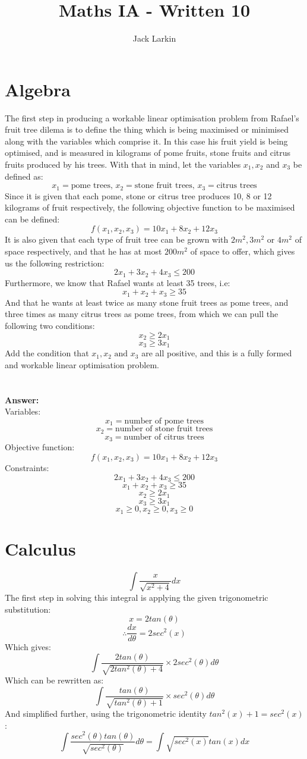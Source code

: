 \documentclass[11pt]{article}
\title{\textbf{Maths IA - Written 10}}
\date{}
\author{Jack Larkin}
\begin{document}
\maketitle
\section*{Algebra}
The first step in producing a workable linear optimisation problem from Rafael's fruit tree dilema is to define the thing which is being maximised or minimised along with the variables which comprise it. In this case his fruit yield is being optimised, and is measured in kilograms of pome fruits, stone fruits and citrus fruits produced by his trees. With that in mind, let the variables $x_1, x_2$ and $x_3$ be defined as:
$$x_1=\text{pome trees, }x_2=\text{stone fruit trees, } x_3=\text{citrus trees}$$
Since it is given that each pome, stone or citrus tree produces 10, 8 or 12 kilograms of fruit respectively, the following objective function to be maximised can be defined:
$$f(x_1,x_2,x_3)=10x_1+8x_2+12x_3$$
It is also given that each type of fruit tree can be grown with $2m^2,3m^2$ or $4m^2$ of space respectively, and that he has at most $200m^2$ of space to offer, which gives us the following restriction:
$$2x_1+3x_2+4x_3\leq 200$$
Furthermore, we know that Rafael wants at least 35 trees, i.e:
$$x_1+x_2+x_3\geq 35$$
And that he wants at least twice as many stone fruit trees as pome trees, and three times as many citrus trees as pome trees, from which we can pull the following two conditions:
$$x_2\geq 2x_1$$
$$x_3\geq 3x_1$$
Add the condition that $x_1,x_2 \text{ and }x_3$ are all positive, and this is a fully formed and workable linear optimisation problem.\\\\\\
\textbf{Answer: }\\
Variables:
$$x_1=\text{number of pome trees}$$
$$x_2=\text{number of stone fruit trees}$$
$$x_3=\text{number of citrus trees}$$
Objective function: 
$$f(x_1,x_2,x_3)=10x_1+8x_2+12x_3$$
Constraints:
$$2x_1+3x_2+4x_3\leq 200$$
$$x_1+x_2+x_3\geq 35$$
$$x_2\geq 2x_1$$
$$x_3\geq 3x_1$$
$$x_1 \geq 0,x_2 \geq 0,x_3 \geq 0$$
\section*{Calculus}
$$\int \frac{x}{\sqrt{x^2+4}}dx$$
The first step in solving this integral is applying the given trigonometric substitution:
$$x=2tan(\theta)$$
$$\therefore \frac{dx}{d\theta}=2sec^2(x)$$
Which gives:
$$\int \frac{2tan(\theta)}{\sqrt{2tan^2(\theta)+4}}\times 2sec^2(\theta)d\theta$$
Which can be rewritten as:
$$\int \frac{tan(\theta)}{\sqrt{tan^2(\theta)+1}}\times sec^2(\theta)d\theta$$
And simplified further, using the trigonometric identity $tan^2(x)+1=sec^2(x)$:
$$\int \frac{sec^2(\theta) tan(\theta)}{\sqrt{sec^2(\theta)}} d\theta = \int \sqrt{sec^2(x)}tan(x)dx$$
\end{document}
